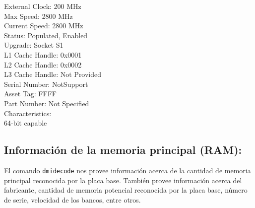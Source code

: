 \documentclass[12pt]{article}
\begin{document}
{{{{	External Clock: 200 MHz\\
	Max Speed: 2800 MHz\\
	Current Speed: 2800 MHz\\
	Status: Populated, Enabled\\
	Upgrade: Socket S1\\
	L1 Cache Handle: 0x0001\\
	L2 Cache Handle: 0x0002\\
	L3 Cache Handle: Not Provided\\
	Serial Number: NotSupport\\
	Asset Tag: FFFF\\
	Part Number: Not Specified\\
	Characteristics:\\
		64-bit capable
}
} \vspace*{0.5cm} } } 

\subsection*{Información de la memoria principal (RAM):}

El comando \texttt{dmidecode} nos provee información acerca de la cantidad de memoria 
principal reconocida por la placa base. También provee información acerca del fabricante, 
cantidad de memoria potencial reconocida por la placa base, número de serie, velocidad de los
bancos, entre otros. 
\end{document}
